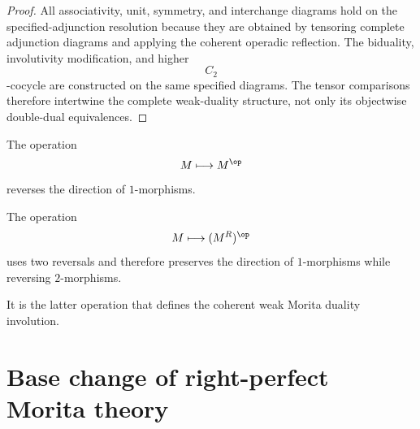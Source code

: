 \begin{proof}
All associativity, unit, symmetry, and interchange diagrams hold on the
specified-adjunction resolution because they are obtained by tensoring
complete adjunction diagrams and applying the coherent operadic
reflection. The biduality, involutivity modification, and higher
\[
    C_2
\]
-cocycle are constructed on the same specified diagrams. The tensor
comparisons therefore intertwine the complete weak-duality structure,
not only its objectwise double-dual equivalences.
\end{proof}

\begin{remark}
\label{rem:op-versus-morita-duality}
The operation
\[
    M
    \longmapsto
    M^{\op}
\]
reverses the direction of $1$-morphisms.

The operation
\[
    M
    \longmapsto
    (M^R)^{\op}
\]
uses two reversals and therefore preserves the direction of
$1$-morphisms while reversing $2$-morphisms.

It is the latter operation that defines the coherent weak Morita duality
involution.
\end{remark}

\section{Base change of right-perfect Morita theory}
\label{sec:base-change-right-perfect-morita}

